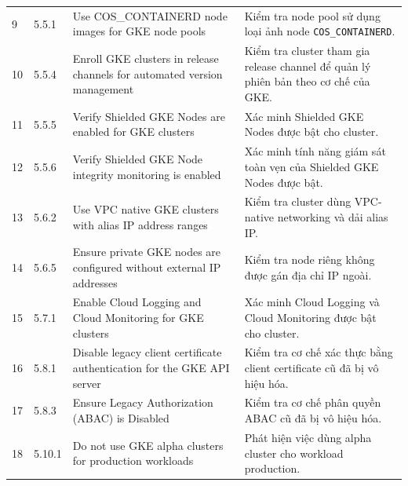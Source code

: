 \begin{longtable}{C{0.85cm} C{1.2cm} L{5.25cm} L{5.9cm}}
9 & 5.5.1 & Use COS\_CONTAINERD node images for GKE node pools & Kiểm tra node pool sử dụng loại ảnh node \texttt{COS\_CONTAINERD}.  \\
10 & 5.5.4 & Enroll GKE clusters in release channels for automated version management & Kiểm tra cluster tham gia release channel để quản lý phiên bản theo cơ chế của GKE.  \\
11 & 5.5.5 & Verify Shielded GKE Nodes are enabled for GKE clusters & Xác minh Shielded GKE Nodes được bật cho cluster.  \\
12 & 5.5.6 & Verify Shielded GKE Node integrity monitoring is enabled & Xác minh tính năng giám sát toàn vẹn của Shielded GKE Nodes được bật.  \\
13 & 5.6.2 & Use VPC native GKE clusters with alias IP address ranges & Kiểm tra cluster dùng VPC-native networking và dải alias IP.  \\
14 & 5.6.5 & Ensure private GKE nodes are configured without external IP addresses & Kiểm tra node riêng không được gán địa chỉ IP ngoài.  \\
15 & 5.7.1 & Enable Cloud Logging and Cloud Monitoring for GKE clusters & Xác minh Cloud Logging và Cloud Monitoring được bật cho cluster.  \\
16 & 5.8.1 & Disable legacy client certificate authentication for the GKE API server & Kiểm tra cơ chế xác thực bằng client certificate cũ đã bị vô hiệu hóa.  \\
17 & 5.8.3 & Ensure Legacy Authorization (ABAC) is Disabled & Kiểm tra cơ chế phân quyền ABAC cũ đã bị vô hiệu hóa.  \\
18 & 5.10.1 & Do not use GKE alpha clusters for production workloads & Phát hiện việc dùng alpha cluster cho workload production.  \\
\end{longtable}
